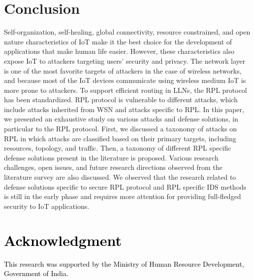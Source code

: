 \documentclass[10pt,journal,sort & compress]{IEEEtran}
\begin{document}
\section{Conclusion}\label{Conclusion}
Self-organization, self-healing, global connectivity, resource constrained, and open nature characteristics of IoT make it the best choice for the development of applications that make human life easier. However, these characteristics also expose IoT to attackers targeting users' security and privacy. The network layer is one of the most favorite targets of attackers in the case of wireless networks, and because most of the IoT devices communicate using wireless medium IoT is more prone to attackers. 
To support efficient routing in LLNs, the RPL protocol has been standardized. RPL protocol is vulnerable to different attacks, which include attacks inherited from WSN and attacks specific to RPL. In this paper, we presented an exhaustive study on various attacks and defense solutions, in particular to the RPL protocol. First, we discussed a taxonomy of attacks on RPL in which attacks are classified based on their primary targets, including resources, topology, and traffic. Then, a taxonomy of different RPL specific defense solutions present in the literature is proposed. Various research challenges, open issues, and
future research directions observed from the literature survey
are also discussed. We observed that the research related to defense solutions specific to secure RPL protocol and RPL specific IDS methods is still in the early phase and requires more attention for providing full-fledged security to IoT applications. 

\section*{\textcolor{black}{Acknowledgment}}
\textcolor{black}{This research was supported by the Ministry of Human Resource Development, Government of India.}



\end{document}
